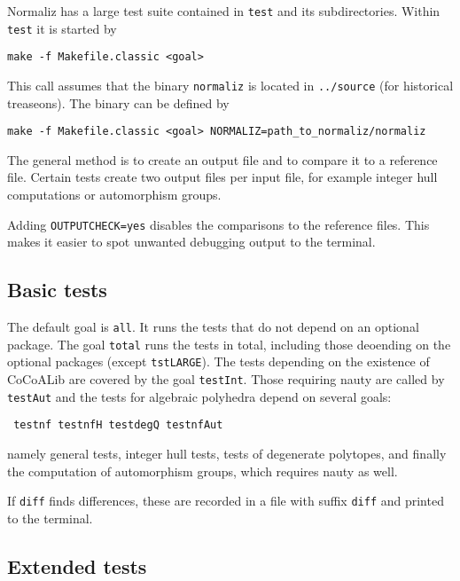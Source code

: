 \documentclass[12pt,a4paper]{scrartcl}
\theoremstyle{definition}
\def\ttt{\texttt}
\begin{document}
Normaliz has a large test suite contained in \verb|test| and its subdirectories. Within \verb|test| it is started by
\begin{Verbatim}
make -f Makefile.classic <goal>
\end{Verbatim}
This call assumes that the binary \verb|normaliz| is located in \verb|../source| (for historical treaseons). The binary can be defined by
\begin{Verbatim} 
make -f Makefile.classic <goal> NORMALIZ=path_to_normaliz/normaliz
\end{Verbatim}
The general method is to create an output file and to compare it to a reference file. Certain tests create two output files per input file, for example integer hull computations or automorphism groups.

Adding \verb|OUTPUTCHECK=yes| disables the comparisons to the reference files. This makes it easier to spot unwanted debugging output to the terminal.

\subsection{Basic tests}
The default goal is \verb|all|. It runs the tests that do not depend on an optional package. The goal \verb|total| runs the tests in total, including those deoending on the optional packages (except \verb|tstLARGE|). The tests depending on the existence of CoCoALib are covered by the goal \verb|testInt|. Those requiring nauty are called by \verb|testAut| and the tests for algebraic polyhedra depend on several goals:
\begin{center}
\ttt{ testnf testnfH testdegQ testnfAut}
\end{center}
namely general tests, integer hull tests, tests of degenerate polytopes, and finally the computation of automorphism groups, which requires nauty as well.

If \verb|diff| finds differences, these are recorded in a file with suffix \verb|diff| and printed to the terminal.

\subsection{Extended tests}
\end{document}
